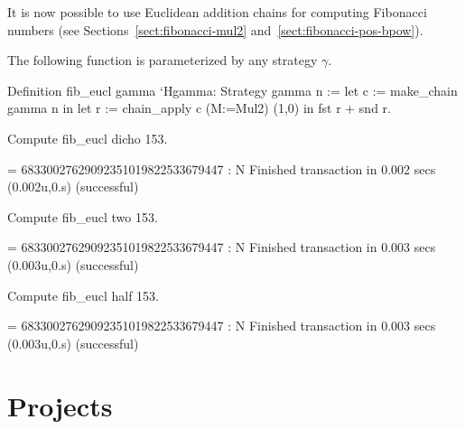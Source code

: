 It is now possible to use Euclidean addition chains for computing Fibonacci numbers
(see Sections~\vref{sect:fibonacci-mul2} and~\vref{sect:fibonacci-pos-bpow}).

The following function is parameterized by any strategy $\gamma$.

\begin{Coqsrc}
Definition fib_eucl gamma `{Hgamma: Strategy gamma} n :=
  let c := make_chain gamma  n
  in let r := chain_apply c (M:=Mul2) (1,0) in
       fst r + snd r.

Compute fib_eucl dicho 153.
\end{Coqsrc}

\begin{Coqanswer}
    = 68330027629092351019822533679447
     : N
Finished transaction in 0.002 secs (0.002u,0.s) (successful)
\end{Coqanswer}

\begin{Coqsrc}
Compute fib_eucl two 153.
\end{Coqsrc}

\begin{Coqanswer}
    = 68330027629092351019822533679447
     : N
Finished transaction in 0.003 secs (0.003u,0.s) (successful)
\end{Coqanswer}

\begin{Coqsrc}
Compute fib_eucl half 153.
\end{Coqsrc}

\begin{Coqanswer}
    = 68330027629092351019822533679447
     : N
Finished transaction in 0.003 secs (0.003u,0.s) (successful)
\end{Coqanswer}


\section{Projects}

